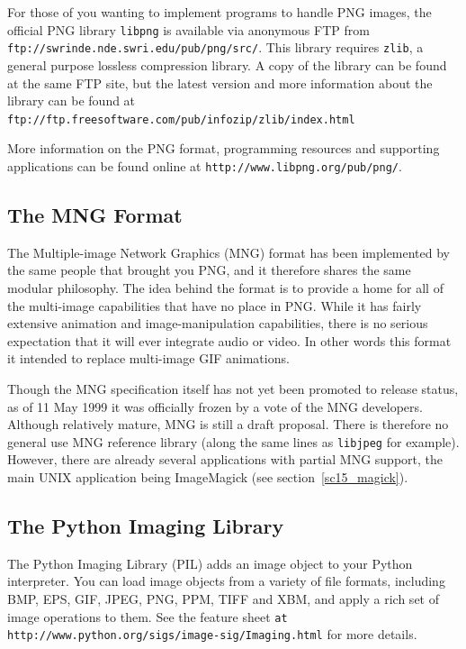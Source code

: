 \documentclass[twoside,11pt]{article}
\newcommand{\htmladdnormallink}[2]{#1}
\newcommand{\htmlref}[2]{#1}
\newcommand{\latex}[1]{#1}
\newcommand{\xlabel}[1]{}
\begin{document}
For those of you wanting to implement programs to handle PNG images, the official PNG library {\tt libpng} is available via anonymous FTP from \htmladdnormallink{{\tt ftp://swrinde.nde.swri.edu/pub/png/src/}}{ftp://swrinde.nde.swri.edu/pub/png/src/}. This library requires {\tt zlib}, a general purpose lossless compression library. A copy of the library can be found at the same FTP site, but the latest version and more information about the library can be found at \htmladdnormallink{{\tt ftp://ftp.freesoftware.com/pub/infozip/zlib/index.html}}{ftp://ftp.freesoftware.com/pub/infozip/zlib/index.html}

More information on the PNG format, programming resources and supporting applications can be found online at \htmladdnormallink{{\tt http://www.libpng.org/pub/png/}}{http://www.libpng.org/pub/png/}.

\subsection{\xlabel{sc15_mng}The MNG Format\label{sc15_mng}}

The \htmladdnormallink{Multiple-image Network Graphics}{http://www.libpng.org/pub/mng/} (MNG) format has been implemented by the same people that brought you PNG, and it therefore shares the same modular philosophy. The idea behind the format is to provide a home for all of the multi-image capabilities that have no place in PNG. While it has fairly extensive animation and image-manipulation capabilities, there is no serious expectation that it will ever integrate audio or video. In other words this format it intended to replace multi-image GIF animations.

Though the MNG specification itself has not yet been promoted to release status, as of 11 May 1999 it was officially frozen by a vote of the MNG developers. Although relatively mature, MNG is still a draft proposal. There is therefore no general use MNG reference library (along the same lines as {\tt libjpeg} for example). However, there are already several applications with partial MNG support, the main UNIX application being  \htmlref{ImageMagick}{sc15_magick}\latex{ (see section~\ref{sc15_magick})}.

\subsection{\xlabel{sc15_pythonimg}The Python Imaging Library\label{sc15_pythonimg}}

The \htmladdnormallink{Python Imaging Library}{http://www.python.org/sigs/image-sig/Imaging.html} (PIL) adds an image object to your Python interpreter. You can load image objects from a variety of file formats, including BMP, EPS, GIF, JPEG, PNG, PPM, TIFF and XBM, and apply a rich set of image operations to them. See the \htmladdnormallink{feature sheet}{http://www.python.org/sigs/image-sig/Features.html} \latex{{\tt at http://www.python.org/sigs/image-sig/Imaging.html}} for more details. 
\end{document}
